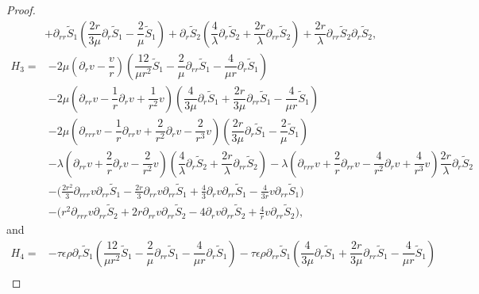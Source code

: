 \documentclass[10pt,reqno]{amsart}
\numberwithin{equation}{section}
\begin{document}
\begin{proof}
\begin{equation}
\begin{aligned}
				&
				+\partial_{rr}\tilde{S}_1(\dfrac{2r}{3\mu}\partial_{r}\tilde{S}_1 -\dfrac{2}{\mu}\tilde{S}_1)
				+\partial_{r}\tilde{S}_2
				(\dfrac{4}{\lambda}\partial_{r}\tilde{S}_2+\dfrac{2r}{\lambda}\partial_{rr}\tilde{S}_2)
				+\dfrac{2r}{\lambda}\partial_{rr}\tilde{S}_2\partial_{r}\tilde{S}_2,
			\end{aligned}
		\end{equation}
		\begin{equation}\nonumber
			\begin{aligned}
				H_3
				=
				&-2\mu(\partial_r v- \dfrac{v}{r})(\dfrac{12}{\mu r^2}\tilde{S}_1-\dfrac{2}{\mu}\partial_{rr}\tilde{S}_1-\dfrac{4}{\mu r}\partial_{r}\tilde{S}_1)\\
				&-2\mu\left(\partial_{rr} v- \dfrac{1}{r}\partial_r v
				+\dfrac{1}{r^2} v \right)(\dfrac{4}{3\mu}\partial_{r}\tilde{S}_1+\dfrac{2r}{3\mu}\partial_{rr}\tilde{S}_1 -\dfrac{4}{\mu r}\tilde{S}_1)\\
				&
				-2\mu\left(\partial_{rrr} v- \dfrac{1}{r}\partial_{rr} v
				+\dfrac{2}{r^2} \partial_{r}v-\dfrac{2}{r^3}v \right)(\dfrac{2r}{3\mu}\partial_{r}\tilde{S}_1 -\dfrac{2}{\mu}\tilde{S}_1)\\
				&-\lambda \left(\partial_{rr} v+\dfrac{2}{r}\partial_r v-\dfrac{2}{r^2} v\right)
				(\dfrac{4}{\lambda}\partial_{r}\tilde{S}_2+\dfrac{2r}{\lambda}\partial_{rr}\tilde{S}_2)
				-\lambda \left(\partial_{rrr} v+\dfrac{2}{r}\partial_{rr} v-\dfrac{4}{r^2} \partial_{r}v+\dfrac{4}{r^3}v\right)\dfrac{2r}{\lambda}\partial_{r}\tilde{S}_2\\
				&-\bigg(\frac{2r^2}{3}\partial_{rrr} v\partial_{rr} \tilde{S}_1- \frac{2r}{3}\partial_{rr} v\partial_{rr}\tilde{S}_1
				+\frac{4}{3} \partial_{r}v\partial_{rr} \tilde{S}_1-\frac{4}{3r}v\partial_{rr} \tilde{S}_1
				\bigg)\\
				&-\bigg(r^2\partial_{rrr}v\partial_{rr} \tilde{S}_2 +2r\partial_{rr}v\partial_{rr} \tilde{S}_2
				-4\partial_{r}v\partial_{rr} \tilde{S}_2+\frac{4}{r}v\partial_{rr} \tilde{S}_2\bigg),
			\end{aligned}
		\end{equation}
		and
		\begin{equation}\nonumber
			\begin{aligned}
				H_4=
				&-\tau\epsilon\rho\partial_{r}\tilde{S}_1(\dfrac{12}{\mu r^2}\tilde{S}_1-\dfrac{2}{\mu}\partial_{rr}\tilde{S}_1-\dfrac{4}{\mu r}\partial_{r}\tilde{S}_1)
				-\tau\epsilon\rho\partial_{rr}\tilde{S}_1
				(\dfrac{4}{3\mu}\partial_{r}\tilde{S}_1+\dfrac{2r}{3\mu}\partial_{rr}\tilde{S}_1 -\dfrac{4}{\mu r}\tilde{S}_1)\\

\end{aligned}
\end{equation}
\end{proof}
\end{document}
